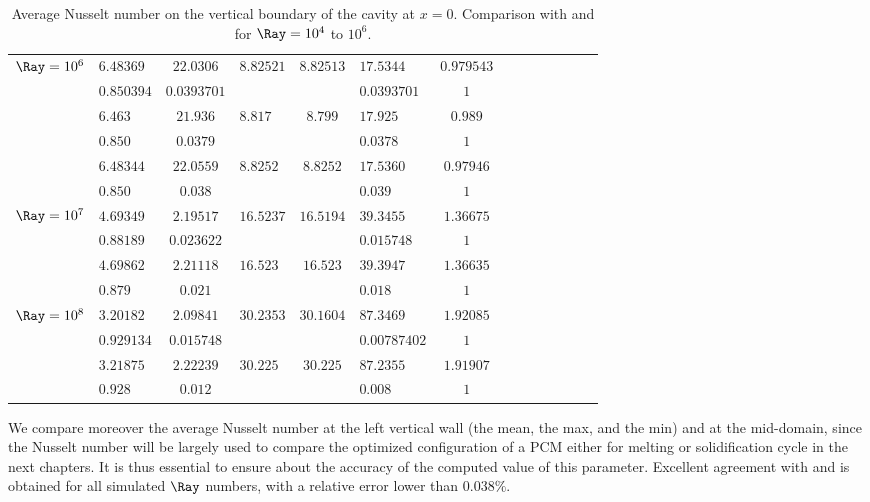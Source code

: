 \begin{table}
\begin{center}
\begin{tabular}{*{7}{cl}}
          \multirow{2}{*}{$\Ray = 10^6$} & $6.48369$ & $22.0306$ & \multirow{2}{*}{$8.82521$} & \multirow{2}{*}{$8.82513 $} & $17.5344$ & $0.979543$  \\
          & $0.850394$ & $0.0393701$ & & & $0.0393701$ & $1$ \\ 
          \multirow{2}{*}{\cite{de1983natural}} & $6.463$ & $21.936 $ & \multirow{2}{*}{$8.817$} & \multirow{2}{*}{$8.799 $} & $17.925$ & $0.989$  \\
          & $0.850$ & $0.0379$ & & & $0.0378$ & $1$ \\
          \multirow{2}{*}{\cite{LeQuere91}} & $6.48344$ & $22.0559 $ & \multirow{2}{*}{$8.8252$} & \multirow{2}{*}{$8.8252 $} & $17.5360$ & $0.97946$  \\
          & $0.850$ & $0.038$ & & & $0.039$ & $1$ \\ \hline
          
          \multirow{2}{*}{$\Ray = 10^7$} & $4.69349$ & $2.19517$ & \multirow{2}{*}{$16.5237$} & \multirow{2}{*}{$16.5194 $} & $39.3455$ & $1.36675$  \\
          & $0.88189$ & $0.023622$ & & & $0.015748$ & $1$ \\ 
          \multirow{2}{*}{\cite{LeQuere91}} & $4.69862$ & $2.21118 $ & \multirow{2}{*}{$16.523$} & \multirow{2}{*}{$16.523 $} & $39.3947$ & $1.36635$  \\
          & $0.879$ & $0.021$ & & & $0.018$ & $1$ \\ \hline

          \multirow{2}{*}{$\Ray = 10^8$} & $3.20182$ & $2.09841$ & \multirow{2}{*}{$30.2353$} & \multirow{2}{*}{$30.1604 $} & $87.3469$ & $1.92085$  \\
          & $0.929134$ & $0.015748$ & & & $0.00787402$ & $1$ \\ 
          \multirow{2}{*}{\cite{LeQuere91}} & $3.21875$ & $2.22239 $ & \multirow{2}{*}{$30.225$} & \multirow{2}{*}{$30.225 $} & $87.2355$ & $1.91907$  \\
          & $0.928$ & $0.012$ & & & $0.008$ & $1$ \\ \bottomrule
          
               \end{tabular}
   \end{center}
   \caption{Average Nusselt number on the vertical boundary of the cavity at $x=0$. Comparison with \cite{de1983natural} and \cite{LeQuere91} for $\Ray= 10^4$ to $10^6$.}
   \label{tab-Nu-natconv}
\end{table}
We compare moreover the average Nusselt number at the left vertical wall (the mean, the max, and the min) and at the mid-domain, 
since the Nusselt number will be largely used to compare the optimized configuration of a PCM either for melting or solidification cycle in the next chapters.
It is thus essential to ensure about the accuracy of the computed value of this parameter.
Excellent agreement with \cite{de1983natural} and \cite{LeQuere91} is obtained for all simulated $\Ray$ numbers, with a relative error lower than $0.038 \%$.



